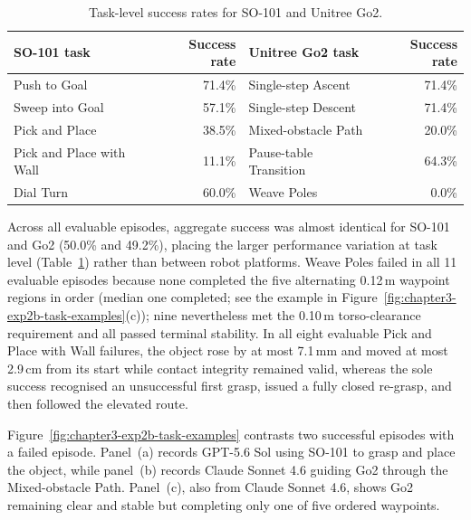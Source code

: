 \begin{table}[htbp]
  \centering
  \small
  \renewcommand{\arraystretch}{1.12}
  \caption{Task-level success rates for SO-101 and Unitree Go2.}
  \label{tab:chapter3-exp2b-task-results}
  \begin{tabularx}{\textwidth}{@{}X r X r@{}}
    \toprule
    \textbf{SO-101 task} & \textbf{Success rate} &
    \textbf{Unitree Go2 task} & \textbf{Success rate} \\
    \midrule
    Push to Goal             & 71.4\% &
    Single-step Ascent       & 71.4\% \\
    Sweep into Goal          & 57.1\% &
    Single-step Descent      & 71.4\% \\
    Pick and Place           & 38.5\% &
    Mixed-obstacle Path      & 20.0\% \\
    Pick and Place with Wall & 11.1\% &
    Pause-table Transition   & 64.3\% \\
    Dial Turn                & 60.0\% &
    Weave Poles              & 0.0\% \\
    \bottomrule
  \end{tabularx}
\end{table}

Across all evaluable episodes, aggregate success was almost identical for SO-101 and Go2 (50.0\% and 49.2\%), placing the larger performance variation at task level (Table~\ref{tab:chapter3-exp2b-task-results}) rather than between robot platforms. Weave Poles failed in all 11 evaluable episodes because none completed the five alternating 0.12\,m waypoint regions in order (median one completed; see the example in Figure~\ref{fig:chapter3-exp2b-task-examples}(c)); nine nevertheless met the 0.10\,m torso-clearance requirement and all passed terminal stability. In all eight evaluable Pick and Place with Wall failures, the object rose by at most 7.1\,mm and moved at most 2.9\,cm from its start while contact integrity remained valid, whereas the sole success recognised an unsuccessful first grasp, issued a fully closed re-grasp, and then followed the elevated route.

Figure~\ref{fig:chapter3-exp2b-task-examples} contrasts two successful
episodes with a failed episode. Panel~(a) records GPT-5.6 Sol using SO-101
to grasp and place the object, while panel~(b) records Claude Sonnet 4.6
guiding Go2 through the Mixed-obstacle Path. Panel~(c), also from Claude
Sonnet 4.6, shows Go2 remaining clear and stable but completing only one of
five ordered waypoints.

